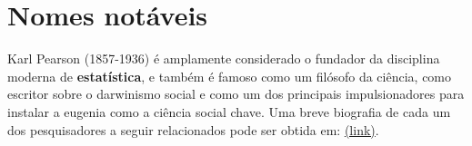 \documentclass[
]{book}
\begin{document}
\hfill\break

\hypertarget{nomes-notuxe1veis}{%
\section{Nomes notáveis}\label{nomes-notuxe1veis}}

Karl Pearson (1857-1936) é amplamente considerado o fundador da disciplina moderna de \textbf{estatística}, e também é famoso como um filósofo da ciência, como escritor sobre o darwinismo social e como um dos principais impulsionadores para instalar a eugenia como a ciência social chave. Uma breve biografia de cada um dos pesquisadores a seguir relacionados pode ser obtida em: \href{http://www-history.mcs.st-andrews.ac.uk/BiogIndex.html}{(link)}.

\hfill\break
\end{document}
